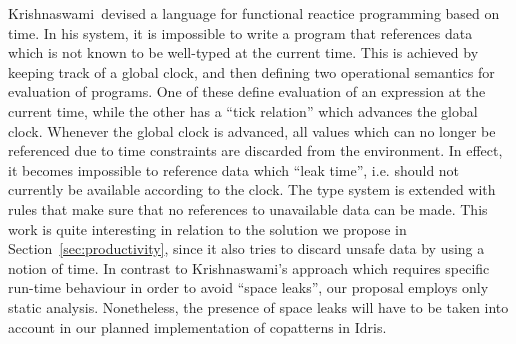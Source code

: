 Krishnaswami\,\citep{Krishnaswami13} devised a language for functional reactice programming based on time. In his system, it is impossible to write a program that references data which is not known to be well-typed at the current time. This is achieved by keeping track of a global clock, and then defining two operational semantics for evaluation of programs. One of these define evaluation of an expression at the current time, while the other has a ``tick relation'' which advances the global clock. Whenever the global clock is advanced, all values which can no longer be referenced due to time constraints are discarded from the environment. In effect, it becomes impossible to reference data which ``leak time'', i.e. should not currently be available according to the clock. The type system is extended with rules that make sure that no references to unavailable data can be made. This work is quite interesting in relation to the solution we propose in Section~\ref{sec:productivity}, since it also tries to discard unsafe data by using a notion of time. In contrast to Krishnaswami's approach which requires specific run-time behaviour in order to avoid ``space leaks'', our proposal employs only static analysis. Nonetheless, the presence of space leaks will have to be taken into account in our planned implementation of copatterns in Idris.

